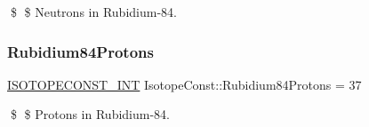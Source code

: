 \$ \$ Neutrons in Rubidium-\/84. \mbox{\label{group___isotope_const-_rubidium-_rb84_ga56c3daa120de18942ed0b45ddea619fd}} 
\subsubsection{\texorpdfstring{Rubidium84\+Protons}{Rubidium84Protons}}
{\footnotesize\ttfamily \mbox{\hyperlink{group___isotope_const-_macros_ga5f18360b3e99483a35c32d789e62621c}{I\+S\+O\+T\+O\+P\+E\+C\+O\+N\+S\+T\+\_\+\+I\+NT}} Isotope\+Const\+::\+Rubidium84\+Protons = 37}

\$ \$ Protons in Rubidium-\/84. 